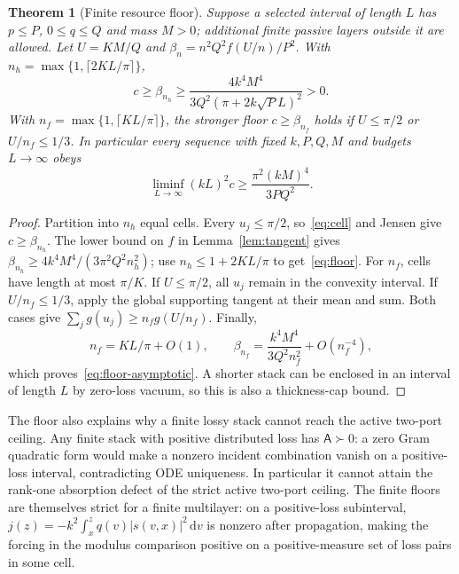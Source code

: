 \documentclass[11pt,a4paper]{article}
\newtheorem{theorem}{Theorem}[section]
\theoremstyle{remark}
\newcommand{\abs}[1]{\lvert #1\rvert}
\newcommand{\dd}{\,\mathrm d}
\begin{document}
\begin{theorem}[Finite resource floor]\label{thm:floor}
Suppose a selected interval of length $L$ has $p\leq P$, $0\leq q\leq Q$ and mass $M>0$; additional finite passive layers outside it are allowed. Let $U=KM/Q$ and $\beta_n=n^2Q^2f(U/n)/P^2$. With $n_h=\max\{1,\lceil2KL/\pi\rceil\}$,
\begin{equation}\label{eq:floor}
 c\geq\beta_{n_h}\geq\frac{4k^4M^4}{3Q^2(\pi+2k\sqrt P L)^2}>0.
\end{equation}
With $n_f=\max\{1,\lceil KL/\pi\rceil\}$, the stronger floor $c\geq\beta_{n_f}$ holds if $U\leq\pi/2$ or $U/n_f\leq1/3$. In particular every sequence with fixed $k,P,Q,M$ and budgets $L\to\infty$ obeys
\begin{equation}\label{eq:floor-asymptotic}
 \liminf_{L\to\infty}(kL)^2c\geq\frac{\pi^2(kM)^4}{3PQ^2}.
\end{equation}
\end{theorem}
\begin{proof}
Partition into $n_h$ equal cells. Every $u_j\leq\pi/2$, so~\eqref{eq:cell} and Jensen give $c\geq\beta_{n_h}$. The lower bound on $f$ in Lemma~\ref{lem:tangent} gives $\beta_{n_h}\geq4k^4M^4/(3\pi^2Q^2n_h^2)$; use $n_h\leq1+2KL/\pi$ to get~\eqref{eq:floor}. For $n_f$, cells have length at most $\pi/K$. If $U\leq\pi/2$, all $u_j$ remain in the convexity interval. If $U/n_f\leq1/3$, apply the global supporting tangent at their mean and sum. Both cases give $\sum_jg(u_j)\geq n_fg(U/n_f)$. Finally,
\[
 n_f=KL/\pi+O(1),\qquad
 \beta_{n_f}=\frac{k^4M^4}{3Q^2n_f^2}+O(n_f^{-4}),
\]
which proves~\eqref{eq:floor-asymptotic}. A shorter stack can be enclosed in an interval of length $L$ by zero-loss vacuum, so this is also a thickness-cap bound.
\end{proof}

The floor also explains why a finite lossy stack cannot reach the active two-port ceiling. Any finite stack with positive distributed loss has $\mathsf A\succ0$: a zero Gram quadratic form would make a nonzero incident combination vanish on a positive-loss interval, contradicting ODE uniqueness. In particular it cannot attain the rank-one absorption defect of the strict active two-port ceiling. The finite floors are themselves strict for a finite multilayer: on a positive-loss subinterval, $j(z)=-k^2\int_x^zq(v)\abs{s(v,x)}^2\dd v$ is nonzero after propagation, making the forcing in the modulus comparison positive on a positive-measure set of loss pairs in some cell.
\end{document}
